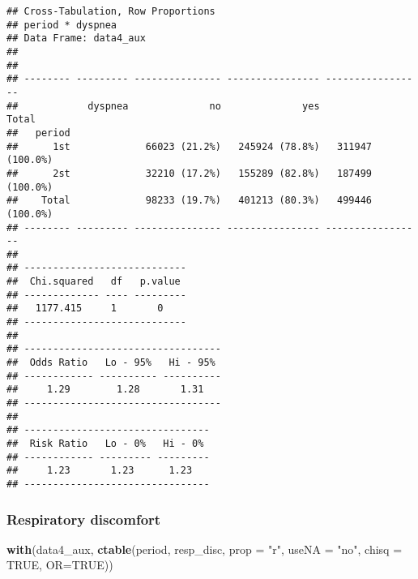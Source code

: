 \documentclass[
]{article}
\newenvironment{Shaded}{\begin{snugshade}}{\end{snugshade}}
\newcommand{\DataTypeTok}[1]{\textcolor[rgb]{0.13,0.29,0.53}{#1}}
\newcommand{\KeywordTok}[1]{\textcolor[rgb]{0.13,0.29,0.53}{\textbf{#1}}}
\newcommand{\NormalTok}[1]{#1}
\newcommand{\OtherTok}[1]{\textcolor[rgb]{0.56,0.35,0.01}{#1}}
\newcommand{\StringTok}[1]{\textcolor[rgb]{0.31,0.60,0.02}{#1}}
\begin{document}
\begin{verbatim}
## Cross-Tabulation, Row Proportions  
## period * dyspnea  
## Data Frame: data4_aux  
## 
## 
## -------- --------- --------------- ---------------- -----------------
##            dyspnea              no              yes             Total
##   period                                                             
##      1st             66023 (21.2%)   245924 (78.8%)   311947 (100.0%)
##      2st             32210 (17.2%)   155289 (82.8%)   187499 (100.0%)
##    Total             98233 (19.7%)   401213 (80.3%)   499446 (100.0%)
## -------- --------- --------------- ---------------- -----------------
## 
## ----------------------------
##  Chi.squared   df   p.value 
## ------------- ---- ---------
##   1177.415     1       0    
## ----------------------------
## 
## ----------------------------------
##  Odds Ratio   Lo - 95%   Hi - 95% 
## ------------ ---------- ----------
##     1.29        1.28       1.31   
## ----------------------------------
## 
## --------------------------------
##  Risk Ratio   Lo - 0%   Hi - 0% 
## ------------ --------- ---------
##     1.23       1.23      1.23   
## --------------------------------
\end{verbatim}

\hypertarget{respiratory-discomfort-1}{%
\subsubsection{Respiratory discomfort}\label{respiratory-discomfort-1}}

\begin{Shaded}
\begin{Highlighting}[]
\KeywordTok{with}\NormalTok{(data4_aux, }\KeywordTok{ctable}\NormalTok{(period, resp_disc, }\DataTypeTok{prop =} \StringTok{"r"}\NormalTok{, }\DataTypeTok{useNA =} \StringTok{"no"}\NormalTok{, }\DataTypeTok{chisq =} \OtherTok{TRUE}\NormalTok{, }\DataTypeTok{OR=}\OtherTok{TRUE}\NormalTok{))}
\end{Highlighting}
\end{Shaded}
\end{document}
